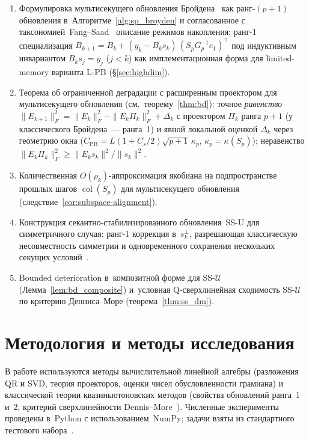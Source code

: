 \begin{enumerate}[leftmargin=*]
  \item Формулировка мультисекущего обновления
        Бройдена~\cite{schnabel1983} как ранг-$(p{+}1)$ обновления
        в~Алгоритме~\ref{alg:sp_broyden} и согласованное с
        таксономией~Fang--Saad~\cite{fang2009} описание режимов
        накопления; ранг-1 специализация
        $B_{k+1} = B_k + (y_k - B_k s_k)\,(S_p G_p^{-1} e_1)^\top$ под
        индуктивным инвариантом $B_k s_j = y_j$ ($j<k$) как
        имплементационная форма для limited-memory варианта L-PB
        (\S\ref{sec:highdim}).
  \item Теорема об ограниченной деградации с расширенным проектором
        для мультисекущего обновления (см.~теорему~\ref{thm:bd}):
        точное \emph{равенство}
        $\|E_{k+1}\|_F^2 = \|E_k\|_F^2 - \|E_k \Pi_k\|_F^2 + \Delta_k$
        с проектором $\Pi_k$ ранга $p{+}1$ (у классического
        Бройдена~--- ранга~1) и явной локальной оценкой $\Delta_k$
        через геометрию окна
        ($C_{\mathrm{PB}} = L(1+C_s/2)\sqrt{p+1}\,\kappa_p$,
        $\kappa_p = \kappa(S_p)$); неравенство
        $\|E_k\Pi_k\|_F^2 \ge \|E_k s_k\|^2/\|s_k\|^2$.
  \item Количественная $O(\rho_k)$-аппроксимация якобиана на
        подпространстве прошлых шагов $\operatorname{col}(S_p)$
        для мультисекущего обновления
        (следствие~\ref{cor:subspace-alignment}).
  \item Конструкция секантно-стабилизированного обновления~SS-U
        для симметричного случая: ранг-1 коррекция в~$s_k^{\perp}$,
        разрешающая классическую несовместность симметрии и
        одновременного сохранения нескольких секущих
        условий~\cite{schnabel1983}.
  \item Bounded deterioration в~композитной форме для
        SS-$\mathcal{U}$ (Лемма~\ref{lem:bd_composite}) и~условная
        Q-сверхлинейная сходимость SS-$\mathcal{U}$ по критерию
        Денниса--Море (теорема~\ref{thm:ss_dm}).
\end{enumerate}

\section*{Методология и методы исследования}

В работе используются методы вычислительной линейной алгебры
(разложения QR и SVD, теория проекторов, оценки чисел обусловленности
грамиана) и классической теории квазиньютоновских методов
(свойства обновлений ранга~1 и~2, критерий сверхлинейности
Dennis--More~\cite{dennis1977}).
Численные эксперименты проведены в~Python с использованием~NumPy;
задачи взяты из стандартного тестового набора~\cite{more1981}.

